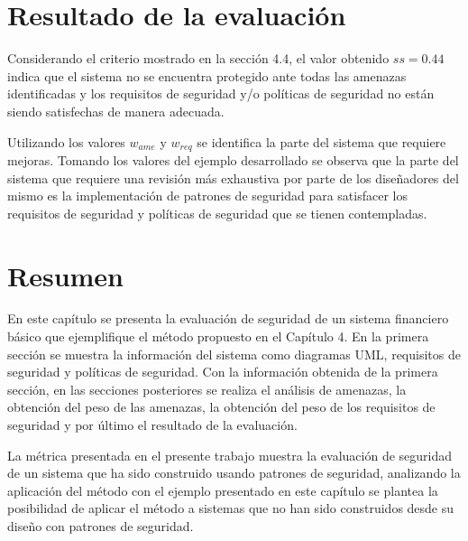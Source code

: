 \section{Resultado de la evaluación}

Considerando el criterio mostrado en la sección 4.4, el valor obtenido $ss=0.44$ indica que el sistema no se encuentra protegido ante todas las amenazas identificadas y los requisitos de seguridad y/o políticas de seguridad no están siendo satisfechas de manera adecuada. 

\vspace{0.3cm}

Utilizando los valores $w_{ame}$ y $w_{req}$ se identifica la parte del sistema que requiere mejoras. Tomando los valores del ejemplo desarrollado se observa que la parte del sistema que requiere una revisión más exhaustiva por parte de los diseñadores del mismo es la implementación de patrones de seguridad para satisfacer los requisitos de seguridad y políticas de seguridad que se tienen contempladas.

\section{Resumen}

En este capítulo se presenta la evaluación de seguridad de un sistema financiero básico que ejemplifique el método propuesto en el Capítulo 4. En la primera sección se muestra la información del sistema como diagramas UML, requisitos de seguridad y políticas de seguridad. Con la información obtenida de la primera sección, en las secciones posteriores se realiza el análisis de amenazas, la obtención del peso de las amenazas, la obtención del peso de los requisitos de seguridad y por último el resultado de la evaluación. 

\vspace{0.3cm}

La métrica presentada en el presente trabajo muestra la evaluación de seguridad de un sistema que ha sido construido usando patrones de seguridad, analizando la aplicación del método con el ejemplo presentado en este capítulo se plantea la posibilidad de aplicar el método a sistemas que no han sido construidos desde su diseño con patrones de seguridad. 


